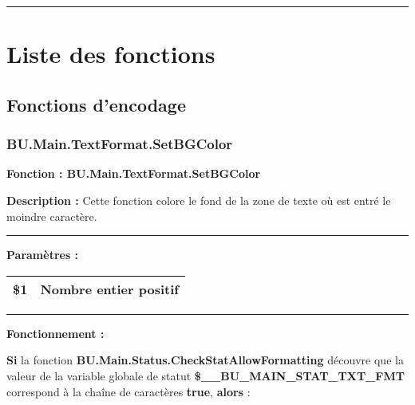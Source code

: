 \documentclass[a4paper,10pt]{article}
\begin{document}


\color{sec1}\par\noindent\rule{\textwidth}{0.4pt}\color{text}

\color{sec1}
\section{Liste des fonctions}\color{text}

\color{sec2}
\subsection{Fonctions d'encodage}\color{text}

\color{sec3}
\subsubsection{BU.Main.TextFormat.SetBGColor}\color{text}

\begin{justify}
    \textbf{Fonction : \color{func}BU.Main.TextFormat.SetBGColor}
\end{justify}

\setlength{\parskip}{1em}

\begin{justify}
    \textbf{Description :} Cette fonction colore le fond de la zone de texte où est entré le moindre caractère.
\end{justify}


\par\noindent\rule{\textwidth}{0.4pt}

\begin{justify}
    \textbf{Paramètres :}

    \begin{tabular}{|l|l|}
        \hline
        \textbf{\color{orange}\$1} & Nombre entier positif\\
        \hline
    \end{tabular}
\end{justify}


\par\noindent\rule{\textwidth}{0.4pt}

\begin{justify}
    \textbf{Fonctionnement :}

    \textbf{\color{cond}Si} la fonction \textbf{\color{func}BU.Main.Status.CheckStatAllowFormatting} découvre que la valeur de la variable globale de statut \textbf{\color{vars}\$\_\_BU\_MAIN\_STAT\_TXT\_FMT} correspond à la chaîne de caractères \textbf{true}, \textbf{\color{cond}alors} :
\end{justify}
\end{document}
